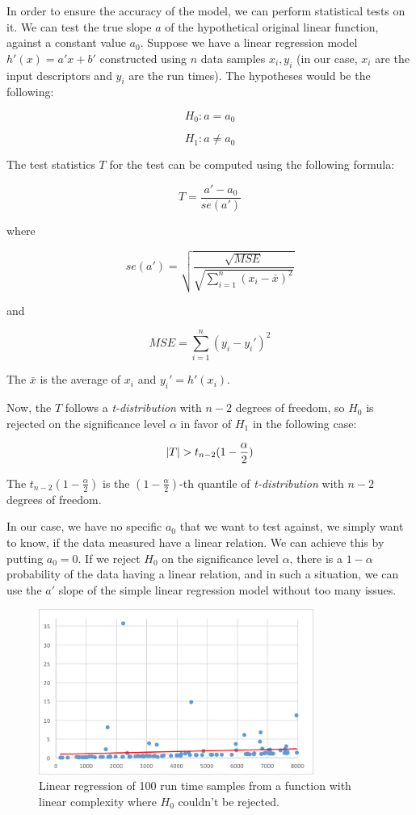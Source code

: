 In order to ensure the accuracy of the model, we can perform statistical tests on it. We can test the true slope \(a\) of the hypothetical original linear function, against a constant value \(a_0\). Suppose we have a linear regression model \(h'(x) = a' x + b'\) constructed using \(n\) data samples \(x_i, y_i\) (in our case, \(x_i\) are the input descriptors and \(y_i\) are the run times). The hypotheses would be the following:

\[H_0: a = a_0 \]

\[H_1: a \neq a_0 \]

The test statistics \(T\) for the test can be computed using the following formula:

\[T = \frac{a' - a_0}{se(a')}\]

where

\[se(a') = \sqrt{\frac{\sqrt{MSE}}{ \sqrt{ \sum_{i = 1}^{n} (x_i - \bar{x})^2 }}} \]

and

\[MSE = { \sum_{i = 1}^{n} (y_i - y_i')^2 }\]

The \(\bar{x}\) is the average of \(x_i\) and \(y_i' = h'(x_i)\).

Now, the \(T\) follows a \textit{t-distribution} with \(n-2\) degrees of freedom, so \(H_0\) is rejected on the significance level $\alpha$ in favor of $H_1$ in the following case:

\[\left|{T}\right| > t_{n - 2}(1-\frac{\alpha}{2})\]

The $t_{n - 2}(1-\frac{\alpha}{2})$ is the $(1-\frac{\alpha}{2})$-th quantile of \textit{t-distribution} with $n-2$ degrees of freedom.

In our case, we have no specific $a_0$ that we want to test against, we simply want to know, if the data measured have a linear relation. We can achieve this by putting $a_0 = 0$. If we reject $H_0$ on the significance level $\alpha$, there is a $1 - \alpha$ probability of the data having a linear relation, and in such a situation, we can use the $a'$ slope of the simple linear regression model without too many issues.

\begin{figure}[h!]
	\centerline{\mbox{\includegraphics[width=90mm]{./img/linear_cantreject.png}}}
	\caption{Linear regression of 100 run time samples from a function with linear complexity where $H_0$ couldn't be rejected.}
	\label{fig:linear_cantreject}
\end{figure}

